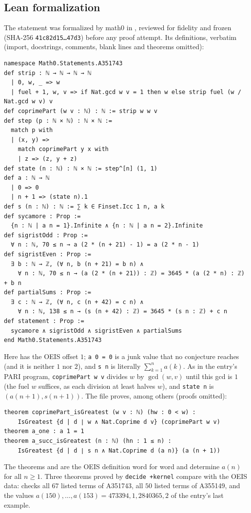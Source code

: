 \documentclass[11pt]{amsart}
\theoremstyle{plain}
\theoremstyle{definition}
\begin{document}
\subsection*{Lean formalization}
The statement was formalized by math0 in , reviewed for fidelity and frozen (SHA-256 \texttt{41c82d15\ldots 47d3}) before any proof attempt. Its definitions, verbatim (import, docstrings, comments, blank lines and theorems omitted):
\begin{lstlisting}
namespace Math0.Statements.A351743
def strip : ℕ → ℕ → ℕ → ℕ
  | 0, w, _ => w
  | fuel + 1, w, v => if Nat.gcd w v = 1 then w else strip fuel (w / Nat.gcd w v) v
def coprimePart (w v : ℕ) : ℕ := strip w w v
def step (p : ℕ × ℕ) : ℕ × ℕ :=
  match p with
  | (x, y) =>
    match coprimePart y x with
    | z => (z, y + z)
def state (n : ℕ) : ℕ × ℕ := step^[n] (1, 1)
def a : ℕ → ℕ
  | 0 => 0
  | n + 1 => (state n).1
def s (n : ℕ) : ℕ := ∑ k ∈ Finset.Icc 1 n, a k
def sycamore : Prop :=
  {n : ℕ | a n = 1}.Infinite ∧ {n : ℕ | a n = 2}.Infinite
def sigristOdd : Prop :=
  ∀ n : ℕ, 70 ≤ n → a (2 * (n + 21) - 1) = a (2 * n - 1)
def sigristEven : Prop :=
  ∃ b : ℕ → ℤ, (∀ n, b (n + 21) = b n) ∧
    ∀ n : ℕ, 70 ≤ n → (a (2 * (n + 21)) : ℤ) = 3645 * (a (2 * n) : ℤ) + b n
def partialSums : Prop :=
  ∃ c : ℕ → ℤ, (∀ n, c (n + 42) = c n) ∧
    ∀ n : ℕ, 138 ≤ n → (s (n + 42) : ℤ) = 3645 * (s n : ℤ) + c n
def statement : Prop :=
  sycamore ∧ sigristOdd ∧ sigristEven ∧ partialSums
end Math0.Statements.A351743
\end{lstlisting}
Here  has the OEIS offset $1$; \texttt{a 0 = 0} is a junk value that no conjecture reaches (and it is neither $1$ nor $2$), and \texttt{s n} is literally $\sum_{k=1}^n a(k)$. As in the entry's PARI program, \texttt{coprimePart w v} divides $w$ by $\gcd(w,v)$ until this gcd is $1$ (the fuel $w$ suffices, as each division at least halves $w$), and \texttt{state n} is $(a(n+1),s(n+1))$. The file proves, among others (proofs omitted):
\begin{lstlisting}
theorem coprimePart_isGreatest (w v : ℕ) (hw : 0 < w) :
    IsGreatest {d | d ∣ w ∧ Nat.Coprime d v} (coprimePart w v)
theorem a_one : a 1 = 1
theorem a_succ_isGreatest (n : ℕ) (hn : 1 ≤ n) :
    IsGreatest {d | d ∣ s n ∧ Nat.Coprime d (a n)} (a (n + 1))
\end{lstlisting}
The theorems  and  are the OEIS definition word for word and determine $a(n)$ for all $n\ge1$. Three theorems proved by \texttt{decide +kernel} compare with the OEIS data:  checks all $67$ listed terms of A351743,  all $50$ listed terms of A355149, and  the values $a(150),\dots,a(153)=473394,1,2840365,2$ of the entry's last example.
\end{document}
